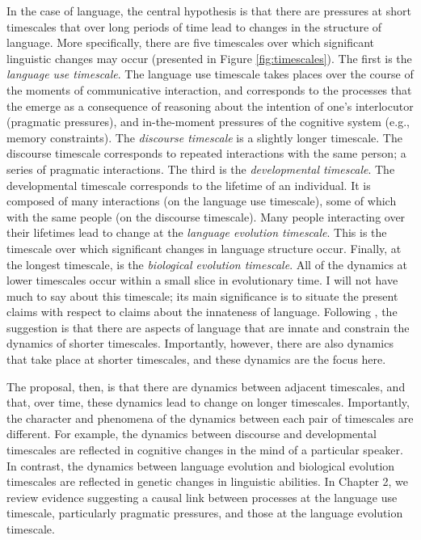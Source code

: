 In the case of language, the central  hypothesis is that there are pressures at  short timescales that over long periods of time lead to changes in the structure of language. More specifically,  there are five timescales over which significant linguistic changes may occur (presented in Figure \ref{fig:timescales}). The first is the {\it language use timescale}. The language use timescale takes places over the course of the moments of communicative interaction, and corresponds to the processes  that the emerge as a consequence of reasoning about the intention of one's interlocutor (pragmatic pressures), and in-the-moment pressures of the cognitive system (e.g., memory constraints).  The {\it discourse timescale} is a slightly longer timescale. The discourse timescale corresponds to repeated interactions with the same person; a series of pragmatic interactions. The third is the {\it developmental timescale}. The developmental timescale corresponds to the lifetime of an individual. It is composed of many interactions (on the language use timescale), some of which with the same people (on the discourse timescale).  Many people interacting over their lifetimes lead to change at the {\it language evolution timescale}. This is the timescale over which significant changes in language structure  occur. Finally, at the longest timescale, is the {\it biological evolution timescale}. All of the dynamics at lower timescales occur within a small slice in evolutionary time. I will not have much to say about this timescale; its main significance is to situate the present claims with respect to claims about the innateness of language. Following , the suggestion is that there are aspects of language that are innate and constrain the dynamics of shorter timescales. Importantly, however, there are also  dynamics that take place at  shorter timescales, and these dynamics are the focus here.


The proposal, then, is that there are dynamics between adjacent timescales, and that, over time, these dynamics lead to change on longer timescales.  Importantly, the character and phenomena of the dynamics between each pair of timescales are different. For example,  the dynamics between discourse and developmental timescales are reflected in cognitive changes in the mind of a particular speaker. In contrast, the dynamics between language evolution and biological evolution timescales are reflected in genetic changes in linguistic abilities. In Chapter 2, we review evidence suggesting a causal link between processes at the language use timescale, particularly pragmatic pressures, and those at the language evolution timescale.

